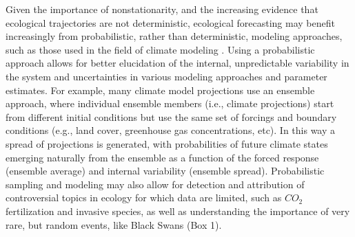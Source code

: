 \documentclass[11pt,a4paper,oneside]{article}
\begin{document}
Given the importance of nonstationarity, and the increasing evidence that ecological trajectories are not deterministic, ecological forecasting may benefit increasingly from probabilistic, rather than deterministic, modeling approaches, such as those used in the field of climate modeling \citep{Tebaldi2007}. Using a probabilistic approach allows for better elucidation of the internal, unpredictable variability in the system and uncertainties in various modeling approaches and parameter estimates. For example, many climate model projections use an ensemble approach, where individual ensemble members (i.e., climate projections) start from different initial conditions but use the same set of forcings and boundary conditions (e.g., land cover, greenhouse gas concentrations, etc). In this way a spread of projections is generated, with probabilities of future climate states emerging naturally from the ensemble as a function of the forced response (ensemble average) and internal variability (ensemble spread). Probabilistic sampling and modeling may also allow for detection and attribution of controversial topics in ecology for which data are limited, such as $CO_{2}$ fertilization and invasive species, as well as understanding the importance of very rare, but random events, like Black Swans (Box 1).\\
 
\\
\end{document}
